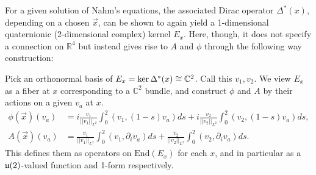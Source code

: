 	For a given solution of Nahm's equations, the associated Dirac operator $\Delta^*(x)$, depending on a chosen $\vec x$, can be shown to again yield a 1-dimensional quaternionic (2-dimensional complex) kernel $E_x$. Here, though, it does not specify a connection on $\mathbb R^4$ but instead gives rise to $A$ and $\phi$ through the following way construction:
	\begin{cons}
		Pick an orthonormal basis of $E_x = \ker \Delta^*(x) \cong 
	\mathbb{C}^2$. Call this $v_1, v_2$. We view $E_x$ as a fiber at $x$ corresponding to a $\mathbb C^2$ bundle, and construct $\phi$ and $A$ by their actions on a given $v_a$ at $x$.
		\begin{equation}
			\begin{aligned}
				\phi(\vec x)(v_a) &= i \frac{v_1}{||v_1||_{L^2}} \int_{0}^2 (v_1, (1-s) v_a) ds + i  \frac{v_2}{||v_2||_{L^2}} \int_0^2 (v_2, (1-s) v_a) ds,\\
				A(\vec x)(v_a) &= \frac{v_1}{||v_1||_{L^2}} \int_{0}^2 (v_1, \partial_i v_a) ds + \frac{v_2}{||v_2||_{L^2}} \int_0^2 (v_2, \partial_i v_a) ds.
			\end{aligned}
		\end{equation}
		This defines them as operators on $\mathrm{End}(E_x)$ for each $x$, and in particular as a $\frak u(2)$-valued function and 1-form respectively.
	\end{cons}


